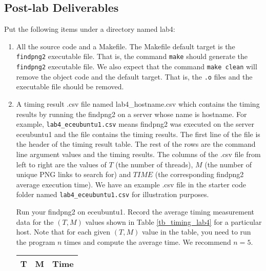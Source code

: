 \subsection{Post-lab Deliverables}
\label{sec:lab4:postlab}
Put the following items under a directory named lab4:
\begin{enumerate}
\item All the source code and a Makefile. The Makefile default target is the \verb+findpng2+ executable file. That is, the command \verb+make+ should generate the \verb+findpng2+ executable file. We also expect that the command \verb+make clean+ will remove the object code and the default target. That is, the \verb+.o+ files and the executable file should be removed.
\item A timing result .csv file named lab4\_hostname.csv 
  which contains the timing results by running the findpng2 on a server whose name is hostname. For example, \verb+lab4_eceubuntu1.csv+ means findpng2 was executed on the server eceubuntu1 and the file contains the timing results.
  The first line of the file is the header of the timing result table. The rest of the rows are the command line argument values and the timing results. The columns of the .csv file from left to right are the values of $T$ (the number of threads), $M$ (the number of unique PNG links to search for) and $TIME$ (the corresponding findpng2 average execution time). We have an example .csv file in the starter code folder named \verb+lab4_eceubuntu1.csv+ for illustration purposes.

Run your findpng2 on eceubuntu1. Record the average timing measurement data for the $(T, M)$ values shown in Table \ref{tb_timing_lab4} for a particular host. Note that for each given $(T, M)$ value in the table, you need to run the program $n$ times and compute the average time. We recommend $n=5$.
\begin{table}[h]
\begin{center}
\begin{tabular}{|c|c|c|}
\hline
T     & M    & Time \\ \hline


\end{tabular}
\end{center}
\end{table}
\end{enumerate}
